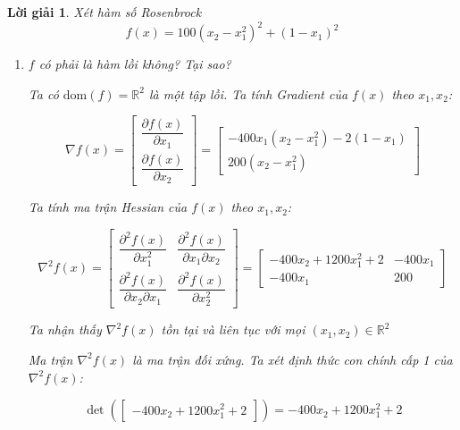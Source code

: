\documentclass[14pt, a4paper]{article}
\theoremstyle{sltheorem}
\theoremstyle{soltheorem}
\newtheorem*{loigiai}{Lời giải}
\begin{document}
    \begin{loigiai}
        Xét hàm số Rosenbrock
        \begin{equation*}
            f(x)=100(x_2 - x_1^2)^2 + (1-x_1)^2
        \end{equation*}
        \begin{enumerate} [wide, labelwidth=!, labelindent=0pt,label=\textbf{\arabic*}.]
            \item $f$ có phải là hàm lồi không? Tại sao?

            Ta có $\mathrm{dom}(f)=\mathbb{R}^{2}$ là một tập lồi. Ta tính Gradient của $f(x)$ theo $x_1, x_2$:

            \begin{equation*}
                \nabla f(x) = \begin{bmatrix} \dfrac{\partial f(x)}{\partial x_1} \\ \dfrac{\partial f(x)}{\partial x_2}\end{bmatrix} = \begin{bmatrix} -400x_1(x_2 - x_1^2) -2(1-x_1) \\ 200(x_2 - x_1^2) \end{bmatrix}
            \end{equation*}

            Ta tính ma trận Hessian của $f(x)$ theo $x_1, x_2$:

            \begin{equation*}
                \nabla^2 f(x)=\begin{bmatrix} \dfrac{\partial^2 f(x)}{\partial x_1^2} & \dfrac{\partial^2 f(x)}{\partial x_1\partial x_2} \\ \dfrac{\partial^2 f(x)}{\partial x_2 \partial x_1 } & \dfrac{\partial^2 f(x)}{\partial x_2^2 } \end{bmatrix} = \begin{bmatrix} -400 x_2 + 1200x_1^2 + 2 & -400 x_1 \\ -400x_1 & 200 \end{bmatrix}
            \end{equation*}

            Ta nhận thấy $\nabla^2 f(x)$ tồn tại và liên tục với mọi $(x_1, x_2) \in \mathbb{R}^{2}$

            Ma trận $\nabla^2 f(x)$ là ma trận đối xứng. Ta xét định thức con chính cấp 1 của $\nabla^2 f(x)$:

            \begin{equation*}
                \det (\begin{bmatrix} -400 x_2 + 1200x_1^2 + 2 \end{bmatrix})=-400 x_2 + 1200x_1^2 + 2
            \end{equation*}


\end{enumerate}
\end{loigiai}
\end{document}
